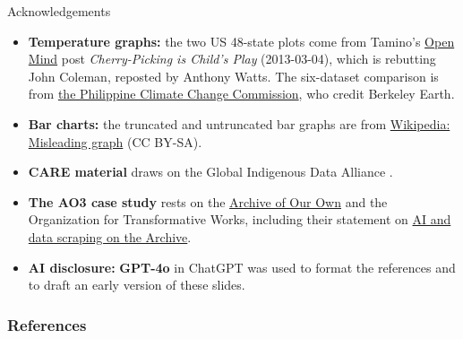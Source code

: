 \documentclass[aspectratio=169]{beamer}
\begin{document}
\begin{frame}[allowframebreaks]{Acknowledgements}
  \small
  \begin{itemize}
  \item \textbf{Temperature graphs:} the two US 48-state plots come from
    Tamino's \href{https://tamino.wordpress.com/2013/03/04/cherry-picking-is-childs-play/}{Open Mind}
    post \textit{Cherry-Picking is Child's Play} (2013-03-04), which is
    rebutting John Coleman, reposted by Anthony Watts.  The six-dataset
    comparison is from
    \href{https://www.climate.gov.ph/news/416}{the Philippine Climate Change Commission},
    who credit Berkeley Earth.
  \item \textbf{Bar charts:} the truncated and untruncated bar graphs are from
    \href{https://en.wikipedia.org/wiki/Misleading_graph}{Wikipedia: Misleading graph} (CC BY-SA).
  \item \textbf{CARE material} draws on the Global Indigenous Data Alliance
    \citep{CARE2020}.
  \item \textbf{The AO3 case study} rests on the
    \href{https://archiveofourown.org/}{Archive of Our Own} and the
    Organization for Transformative Works, including their statement on
    \href{https://www.transformativeworks.org/ai-and-data-scraping-on-the-archive/}{AI and data scraping on the Archive}.
  \item \textbf{AI disclosure:} \textbf{GPT-4o} in ChatGPT
    \citep{openai-chatgpt-2025-03-14} was used to format the references and
    to draft an early version of these slides.
  \aicheck
  \end{itemize}
\end{frame}


\begin{frame}[allowframebreaks]
\frametitle{References}
\printbibliography[heading=none]
\end{frame}
\end{document}
